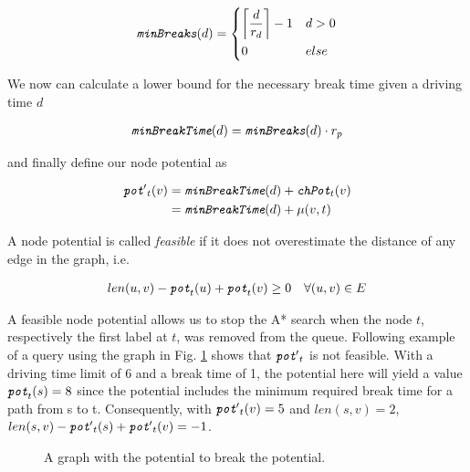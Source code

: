 \begin{align}\label{eq:min_breaks}
	\minBreaks(d) = \begin{dcases}
		\ceil*{ \frac{d}{\restr_d} } - 1 & d > 0 \\
		0                                & else
	\end{dcases}
\end{align}

We now can calculate a lower bound for the necessary break time given a driving time $d$

\begin{align}\label{eq:min_break_time}
	\minBreakTime(d) = \minBreaks(d) \cdot r_p
\end{align}

and finally define our node potential as

\begin{align}
	\concretepotential{'}_t(v) & = \minBreakTime(d) + \chpotential_t(v) \\
	                           & = \minBreakTime(d) + \distance(v,t)
\end{align}

A node potential is called \emph{feasible} if it does not overestimate the distance of any edge in the graph, i.e.

\begin{align}
	\label{eq:node_potential_feasibility}
	len(u,v) - \concretepotential_t(u) + \concretepotential_t(v) \ge 0 \quad \forall (u,v) \in E
\end{align}

A feasible node potential allows us to stop the A* search when the node $t$, respectively the first label at $t$, was removed from the queue. Following example of a query using the graph in Fig. \ref{fig:graph_infeasible_potential} shows that $\concretepotential{'}_t$ is not feasible. With a driving time limit of 6 and a break time of 1, the potential here will yield a value $\concretepotential_t(s) = 8$ since the potential includes the minimum required break time for a path from s to t. Consequently, with $\concretepotential{'}_t(v) = 5$ and $len(s,v) = 2$, $len(s,v) - \concretepotential{'}_t(s) + \concretepotential{'}_t(v) = -1$.

\begin{figure}[hbtp]
	\centering
	
	\caption{A graph with the potential to break the potential.}
	\label{fig:graph_infeasible_potential}
\end{figure}

